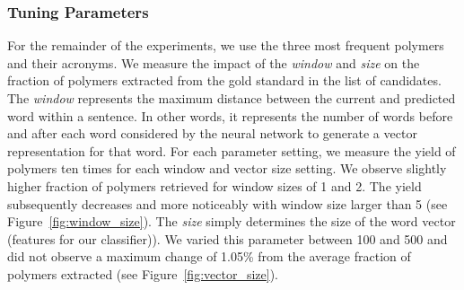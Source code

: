 
\subsubsection{Tuning Parameters}
For the remainder of the experiments, we use the three most frequent polymers and their acronyms. 
We measure the impact of the \textit{window} and \textit{size} on the fraction of polymers extracted from the gold standard in the list of  candidates.
The \textit{window} represents the maximum distance between the current and predicted word within a sentence. In other words, it represents the number of words before and after each word considered by the neural network to generate a vector representation for that word. 
For each parameter setting, we measure the yield of polymers ten times for each window and vector size setting.
We observe slightly higher fraction of polymers retrieved for window sizes of 1 and 2. The yield subsequently decreases and more noticeably with window size larger than 5 (see Figure~\ref{fig:window_size}).
The \textit{size} simply determines the size of the word vector (features for our classifier)).
We varied this parameter between 100 and 500 and did not observe a maximum change of 1.05\% from the average fraction of polymers extracted (see Figure~\ref{fig:vector_size}). %


